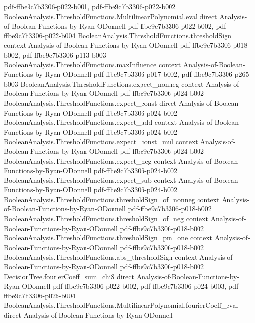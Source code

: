\begin{theorem}
  {pdf-ffbe9c7b3306-p022-b001,
    pdf-ffbe9c7b3306-p022-b002}
\proofstep
  {BooleanAnalysis.ThresholdFunctions.MultilinearPolynomial.eval}
  {direct}
  {Analysis-of-Boolean-Functions-by-Ryan-ODonnell}
  {pdf-ffbe9c7b3306-p022-b002,
    pdf-ffbe9c7b3306-p022-b004}
\proofstep
  {BooleanAnalysis.ThresholdFunctions.thresholdSign}
  {context}
  {Analysis-of-Boolean-Functions-by-Ryan-ODonnell}
  {pdf-ffbe9c7b3306-p018-b002,
    pdf-ffbe9c7b3306-p113-b003}
\proofstep
  {BooleanAnalysis.ThresholdFunctions.maxInfluence}
  {context}
  {Analysis-of-Boolean-Functions-by-Ryan-ODonnell}
  {pdf-ffbe9c7b3306-p017-b002,
    pdf-ffbe9c7b3306-p265-b003}
\proofstep
  {BooleanAnalysis.ThresholdFunctions.expect_nonneg}
  {context}
  {Analysis-of-Boolean-Functions-by-Ryan-ODonnell}
  {pdf-ffbe9c7b3306-p024-b002}
\proofstep
  {BooleanAnalysis.ThresholdFunctions.expect_const}
  {direct}
  {Analysis-of-Boolean-Functions-by-Ryan-ODonnell}
  {pdf-ffbe9c7b3306-p024-b002}
\proofstep
  {BooleanAnalysis.ThresholdFunctions.expect_add}
  {context}
  {Analysis-of-Boolean-Functions-by-Ryan-ODonnell}
  {pdf-ffbe9c7b3306-p024-b002}
\proofstep
  {BooleanAnalysis.ThresholdFunctions.expect_const_mul}
  {context}
  {Analysis-of-Boolean-Functions-by-Ryan-ODonnell}
  {pdf-ffbe9c7b3306-p024-b002}
\proofstep
  {BooleanAnalysis.ThresholdFunctions.expect_neg}
  {context}
  {Analysis-of-Boolean-Functions-by-Ryan-ODonnell}
  {pdf-ffbe9c7b3306-p024-b002}
\proofstep
  {BooleanAnalysis.ThresholdFunctions.expect_sub}
  {context}
  {Analysis-of-Boolean-Functions-by-Ryan-ODonnell}
  {pdf-ffbe9c7b3306-p024-b002}
\proofstep
  {BooleanAnalysis.ThresholdFunctions.thresholdSign_of_nonneg}
  {context}
  {Analysis-of-Boolean-Functions-by-Ryan-ODonnell}
  {pdf-ffbe9c7b3306-p018-b002}
\proofstep
  {BooleanAnalysis.ThresholdFunctions.thresholdSign_of_neg}
  {context}
  {Analysis-of-Boolean-Functions-by-Ryan-ODonnell}
  {pdf-ffbe9c7b3306-p018-b002}
\proofstep
  {BooleanAnalysis.ThresholdFunctions.thresholdSign_pm_one}
  {context}
  {Analysis-of-Boolean-Functions-by-Ryan-ODonnell}
  {pdf-ffbe9c7b3306-p018-b002}
\proofstep
  {BooleanAnalysis.ThresholdFunctions.abs_thresholdSign}
  {context}
  {Analysis-of-Boolean-Functions-by-Ryan-ODonnell}
  {pdf-ffbe9c7b3306-p018-b002}
\proofstep
  {DecisionTree.fourierCoeff_sum_chiS}
  {direct}
  {Analysis-of-Boolean-Functions-by-Ryan-ODonnell}
  {pdf-ffbe9c7b3306-p022-b002,
    pdf-ffbe9c7b3306-p024-b003,
    pdf-ffbe9c7b3306-p025-b004}
\proofstep
  {BooleanAnalysis.ThresholdFunctions.MultilinearPolynomial.fourierCoeff_eval}
  {direct}
  {Analysis-of-Boolean-Functions-by-Ryan-ODonnell}

\end{theorem}
